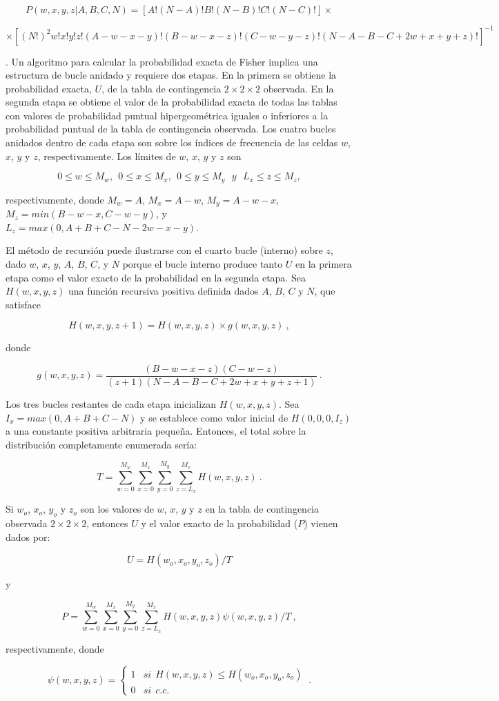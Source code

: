 \documentclass[12pt,a4paper,]{book}
\numberwithin{dummy}{section}
\theoremstyle{ocrenumbox}
\theoremstyle{blacknumex}
\theoremstyle{blacknumbox}
\theoremstyle{ocrenum}
\theoremstyle{ocrenum}
\begin{document}
\[
P(w,x,y,z|A,B,C,N)=[A!(N-A)!B!(N-B)!C!(N-C)!]\times
\]

\[
\times[(N!)^2w!x!y!z!(A-w-x-y)!(B-w-x-z)!(C-w-y-z)!(N-A-B-C+2w+x+y+z)!]^{-1}
\]

\citep{Mielke1994}. Un algoritmo para calcular la probabilidad exacta de
Fisher implica una estructura de bucle anidado y requiere dos etapas. En
la primera se obtiene la probabilidad exacta, \(U\), de la tabla de
contingencia \(2\times2\times2\) observada. En la segunda etapa se
obtiene el valor de la probabilidad exacta de todas las tablas con
valores de probabilidad puntual hipergeométrica iguales o inferiores a
la probabilidad puntual de la tabla de contingencia observada. Los
cuatro bucles anidados dentro de cada etapa son sobre los índices de
frecuencia de las celdas \(w\), \(x\), \(y\) y \(z\), respectivamente.
Los límites de \(w\), \(x\), \(y\) y \(z\) son

\[
0\le w\le M_w,~~0\le x\le M_x,~~0\le y\le M_y~~~ y~~~ L_x\le z\le M_z,
\]

respectivamente, donde \(M_w = A\), \(M_x = A-w\), \(M_y = A-w-x\),
\(M_z = min(B -w- x,C - w - y)\), y
\(L_z = max(0,A + B + C - N - 2w - x - y)\).

El método de recursión puede ilustrarse con el cuarto bucle (interno)
sobre \(z\), dado \(w\), \(x\), \(y\), \(A\), \(B\), \(C\), y \(N\)
porque el bucle interno produce tanto \(U\) en la primera etapa como el
valor exacto de la probabilidad en la segunda etapa. Sea
\(H(w, x, y, z)\) una función recursiva positiva definida dados \(A\),
\(B\), \(C\) y \(N\), que satisface

\[
H(w,x,y,z+1)=H(w,x,y,z)\times g(w,x,y,z)~,
\]

donde

\[
g(w,x,y,z)=\frac{(B-w-x-z)(C-w-z)}{(z+1)(N-A-B-C+2w+x+y+z+1)}~.
\]

Los tres bucles restantes de cada etapa inicializan \(H(w, x, y, z)\).
Sea \(I_x = max(0,A + B + C - N)\) y se establece como valor inicial de
\(H(0, 0, 0, I_z)\) a una constante positiva arbitraria pequeña.
Entonces, el total sobre la distribución completamente enumerada sería:

\[
T=\sum_{w=0}^{M_w}\sum_{x=0}^{M_x}\sum_{y=0}^{M_y}\sum_{z=L_x}^{M_x}H(w,x,y,z)~.
\]

Si \(w_o\), \(x_o\), \(y_o\) y \(z_o\) son los valores de \(w\), \(x\),
\(y\) y \(z\) en la tabla de contingencia observada \(2\times2\times2\),
entonces \(U\) y el valor exacto de la probabilidad (\(P\)) vienen dados
por:

\[
U=H(w_o,x_o,y_o,z_o)/T
\]

y

\[
P=\sum_{w=0}^{M_w}\sum_{x=0}^{M_x}\sum_{y=0}^{M_y}\sum_{z=L_x}^{M_x}H(w,x,y,z)\psi(w,x,y,z)/T~,
\]

respectivamente, donde

\[
\psi(w,x,y,z)=\begin{cases}1 & si~~H(w,x,y,z)\le H(w_o,x_o,y_o,z_o) \\0 & si~~c.c.\end{cases} ~.
\]




\end{document}
